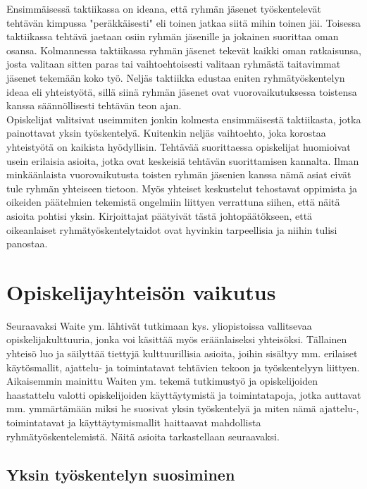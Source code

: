 \documentclass[finnish]{article}
\begin{document}
Ensimmäisessä taktiikassa on ideana, että ryhmän jäsenet työskentelevät tehtävän kimpussa "peräkkäisesti" eli toinen jatkaa siitä mihin toinen jäi. Toisessa taktiikassa tehtävä jaetaan osiin ryhmän jäsenille ja jokainen suorittaa oman osansa. Kolmannessa taktiikassa ryhmän jäsenet tekevät kaikki oman ratkaisunsa, josta valitaan sitten paras tai vaihtoehtoisesti valitaan ryhmästä taitavimmat jäsenet tekemään koko työ. Neljäs taktiikka edustaa eniten ryhmätyöskentelyn ideaa eli yhteistyötä, sillä siinä ryhmän jäsenet ovat vuorovaikutuksessa toistensa kanssa säännöllisesti tehtävän teon ajan.\\

Opiskelijat valitsivat useimmiten jonkin kolmesta ensimmäisestä taktiikasta, jotka painottavat yksin työskentelyä. Kuitenkin neljäs vaihtoehto, joka korostaa yhteistyötä on kaikista hyödyllisin. Tehtävää suorittaessa opiskelijat huomioivat usein erilaisia asioita, jotka ovat keskeisiä tehtävän suorittamisen kannalta. Ilman minkäänlaista vuorovaikutusta toisten ryhmän jäsenien kanssa nämä asiat eivät tule ryhmän yhteiseen tietoon. Myös yhteiset keskustelut tehostavat oppimista ja oikeiden päätelmien tekemistä ongelmiin liittyen verrattuna siihen, että näitä asioita pohtisi yksin. Kirjoittajat päätyivät tästä johtopäätökseen, että oikeanlaiset ryhmätyöskentelytaidot ovat hyvinkin tarpeellisia ja niihin tulisi panostaa.

\section{Opiskelijayhteisön vaikutus}

Seuraavaksi Waite ym. lähtivät tutkimaan kys. yliopistoissa vallitsevaa opiskelijakulttuuria, jonka voi käsittää myös eräänlaiseksi yhteisöksi. Tällainen yhteisö luo ja säilyttää tiettyjä kulttuurillisia asioita, joihin sisältyy mm. erilaiset käytösmallit, ajattelu- ja toimintatavat tehtävien tekoon ja työskentelyyn liittyen. Aikaisemmin mainittu Waiten ym. tekemä tutkimustyö ja opiskelijoiden haastattelu valotti opiskelijoiden käyttäytymistä ja toimintatapoja, jotka auttavat mm. ymmärtämään miksi he suosivat yksin työskentelyä ja miten nämä ajattelu-, toimintatavat ja käyttäytymismallit haittaavat mahdollista ryhmätyöskentelemistä. Näitä asioita tarkastellaan seuraavaksi.

\subsection{Yksin työskentelyn suosiminen}
\end{document}
